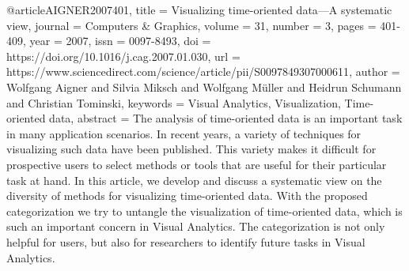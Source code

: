 @article{AIGNER2007401,
title = {Visualizing time-oriented data—A systematic view},
journal = {Computers & Graphics},
volume = {31},
number = {3},
pages = {401-409},
year = {2007},
issn = {0097-8493},
doi = {https://doi.org/10.1016/j.cag.2007.01.030},
url = {https://www.sciencedirect.com/science/article/pii/S0097849307000611},
author = {Wolfgang Aigner and Silvia Miksch and Wolfgang Müller and Heidrun Schumann and Christian Tominski},
keywords = {Visual Analytics, Visualization, Time-oriented data},
abstract = {The analysis of time-oriented data is an important task in many application scenarios. In recent years, a variety of techniques for visualizing such data have been published. This variety makes it difficult for prospective users to select methods or tools that are useful for their particular task at hand. In this article, we develop and discuss a systematic view on the diversity of methods for visualizing time-oriented data. With the proposed categorization we try to untangle the visualization of time-oriented data, which is such an important concern in Visual Analytics. The categorization is not only helpful for users, but also for researchers to identify future tasks in Visual Analytics.}
}